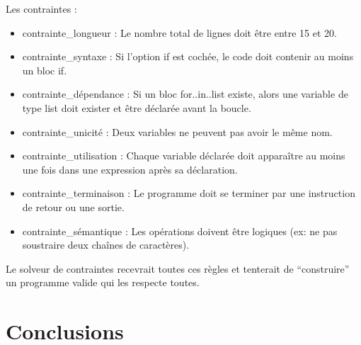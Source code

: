 \documentclass[11pt,a4paper]{article}
\begin{document}
Les contraintes : 
\begin{itemize}
    \item contrainte\_longueur : Le nombre total de lignes doit être entre 15 et 20.
    \item contrainte\_syntaxe : Si l'option if est cochée, le code doit contenir au moins un bloc if.
    \item contrainte\_dépendance : Si un bloc for..in..list existe, alors une variable de type list doit exister et être déclarée avant la boucle.
    \item contrainte\_unicité : Deux variables ne peuvent pas avoir le même nom.
    \item contrainte\_utilisation : Chaque variable déclarée doit apparaître au moins une fois dans une expression après sa déclaration.
    \item contrainte\_terminaison : Le programme doit se terminer par une instruction de retour ou une sortie.
    \item contrainte\_sémantique : Les opérations doivent être logiques (ex: ne pas soustraire deux chaînes de caractères).
\end{itemize}
Le solveur de contraintes recevrait toutes ces règles et tenterait de ``construire'' un programme valide qui les respecte toutes.

\section{Conclusions}
\end{document}
